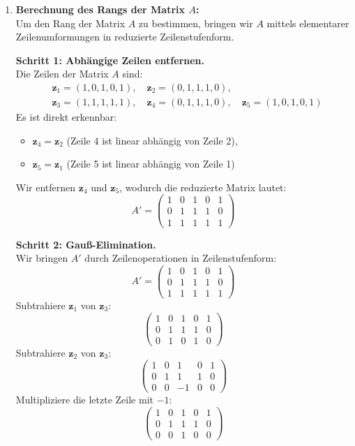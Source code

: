 \documentclass[11pt]{article}
\begin{document}
\begin{enumerate}
    \item \textbf{Berechnung des Rangs der Matrix \( A \):} \\
    Um den Rang der Matrix \( A \) zu bestimmen, bringen wir \( A \) mittels elementarer Zeilenumformungen in reduzierte Zeilenstufenform.

    \textbf{Schritt 1: Abhängige Zeilen entfernen.} \\
    Die Zeilen der Matrix \( A \) sind:
    \[
    \begin{aligned}
        &\mathbf{z}_1 = (1, 0, 1, 0, 1), \quad \mathbf{z}_2 = (0, 1, 1, 1, 0), \\
        &\mathbf{z}_3 = (1, 1, 1, 1, 1), \quad \mathbf{z}_4 = (0, 1, 1, 1, 0), \quad \mathbf{z}_5 = (1, 0, 1, 0, 1)
    \end{aligned}
    \]
    Es ist direkt erkennbar:
    \begin{itemize}
        \item \( \mathbf{z}_4 = \mathbf{z}_2 \) (Zeile 4 ist linear abhängig von Zeile 2),
        \item \( \mathbf{z}_5 = \mathbf{z}_1 \) (Zeile 5 ist linear abhängig von Zeile 1)
    \end{itemize}
    Wir entfernen \( \mathbf{z}_4 \) und \( \mathbf{z}_5 \), wodurch die reduzierte Matrix lautet:
    \[
    A' =
    \begin{pmatrix}
    1 & 0 & 1 & 0 & 1 \\
    0 & 1 & 1 & 1 & 0 \\
    1 & 1 & 1 & 1 & 1
    \end{pmatrix}
    \]

    \textbf{Schritt 2: Gauß-Elimination.} \\
    Wir bringen \( A' \) durch Zeilenoperationen in Zeilenstufenform:
    \[
    A' =
    \begin{pmatrix}
    1 & 0 & 1 & 0 & 1 \\
    0 & 1 & 1 & 1 & 0 \\
    1 & 1 & 1 & 1 & 1
    \end{pmatrix}
    \]
    Subtrahiere \( \mathbf{z}_1 \) von \( \mathbf{z}_3 \):
    \[
    \begin{pmatrix}
    1 & 0 & 1 & 0 & 1 \\
    0 & 1 & 1 & 1 & 0 \\
    0 & 1 & 0 & 1 & 0
    \end{pmatrix}
    \]
    Subtrahiere \( \mathbf{z}_2 \) von \( \mathbf{z}_3 \):
    \[
    \begin{pmatrix}
    1 & 0 & 1 & 0 & 1 \\
    0 & 1 & 1 & 1 & 0 \\
    0 & 0 & -1 & 0 & 0
    \end{pmatrix}
    \]
    Multipliziere die letzte Zeile mit \( -1 \):
    \[
    \begin{pmatrix}
    1 & 0 & 1 & 0 & 1 \\
    0 & 1 & 1 & 1 & 0 \\
    0 & 0 & 1 & 0 & 0
    \end{pmatrix}
    \]


\end{enumerate}
\end{document}
